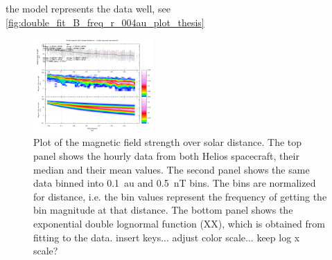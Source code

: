 the model represents the data well, see \autoref{fig:double_fit_B_freq_r_004au_plot_thesis}\\
\begin{figure}[htb]
	\centering
	\includegraphics[width=0.4\textwidth]{images/gnuplots/double_fit_B_freq_r_004au_plot_thesis.png}
	\caption{Plot of the magnetic field strength over solar distance. The top panel shows the hourly data from both Helios spacecraft, their median and their mean values. The second panel shows the same data binned into 0.1~au and 0.5~nT bins. The bins are normalized for distance, i.e. the bin values represent the frequency of getting the bin magnitude at that distance. The bottom panel shows the exponential double lognormal function (XX), which is obtained from fitting to the data. insert keys... adjust color scale... keep log x scale?}
	\label{fig:double_fit_B_freq_r_004au_plot_thesis}
\end{figure}

